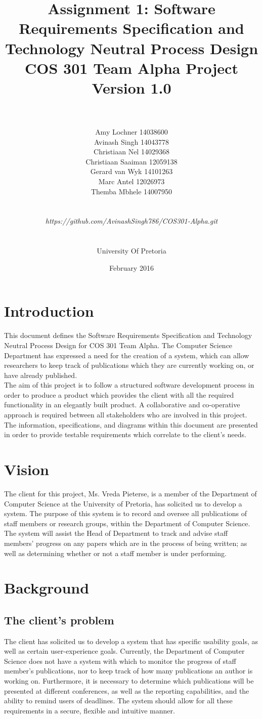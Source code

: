 \documentclass[a4paper]{article}
\title{\huge Assignment 1: Software Requirements Specification and Technology Neutral Process Design
	\\COS 301 Team Alpha Project
	\\Version 1.0}
\author{\\\\Amy Lochner 14038600\\ Avinash Singh 14043778 \\
	Christiaan Nel 14029368\\ Christiaan Saaiman 12059138 \\
	Gerard van Wyk 14101263\\ Marc Antel 12026973\\
	Themba Mbhele 14007950
	\\
	\\
	\\\textit{https://github.com/AvinashSingh786/COS301-Alpha.git}
	\\
	\\
	\\ University Of Pretoria\\}
\date{February 2016}
\begin{document}
	
	\maketitle

	\newpage

	\tableofcontents
	\newpage
	
	\section{Introduction}
	
	This document defines the Software Requirements Specification and Technology Neutral Process Design for COS 301 Team Alpha. The Computer Science Department has expressed a need for the creation of a system, which can allow researchers to keep track of publications which they are currently working on, or have already published.
	\\
	The aim of this project is to follow a structured software development process in order to produce a product which provides the client with all the required functionality in an elegantly built product. A collaborative and co-operative approach is required between all stakeholders who are involved in this project. 
	\\
	The information, specifications, and diagrams within this document are presented in order to provide testable requirements which correlate to the client's needs.
	
	\section{Vision}
	The client for this project, Ms. Vreda Pieterse, is a member of the Department of Computer Science at the University of Pretoria, has solicited us to develop a system. The purpose of this system is to record and oversee all publications of staff members or research groups, within the Department of Computer Science. The system will assist the Head of Department to track and advise staff members' progress on any papers which are in the process of being written; as well as determining whether or not a staff member is under performing.
	
	\section{Background}
	\subsection{The client's problem}
	The client has solicited us to develop a system that has specific usability goals, as well as certain user-experience goals. Currently, the Department of Computer Science does not have a system with which to monitor the progress of staff member's publications, nor to keep track of how many publications an author is working on. Furthermore, it is necessary to determine which publications will be presented at different conferences, as well as the reporting capabilities, and the ability to remind users of deadlines. The system should allow for all these requirements in a secure, flexible and intuitive manner.
	
\end{document}
